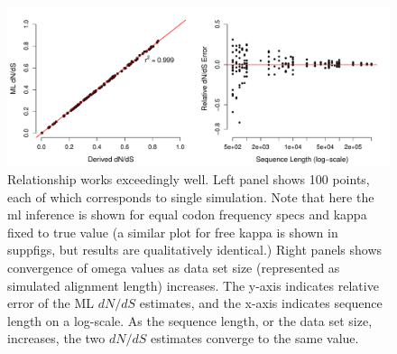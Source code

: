 \documentclass[11pt]{article}
\begin{document}
\begin{figure}[H]
\centerline{\includegraphics[width=6in]{figures/regression_convergence.pdf}}
\caption{\label{reg_conv} Relationship works exceedingly well. Left panel shows 100 points, each of which corresponds to single simulation. Note that here the ml inference is shown for equal codon frequency specs and kappa fixed to true value (a similar plot for free kappa is shown in suppfigs, but results are qualitatively identical.) Right panels shows convergence of omega values as data set size (represented as simulated alignment length) increases. The y-axis indicates relative error of the ML $dN/dS$ estimates, and the x-axis indicates sequence length on a log-scale. As the sequence length, or the data set size, increases, the two $dN/dS$ estimates converge to the same value. }
\end{figure}

	
\end{document}
